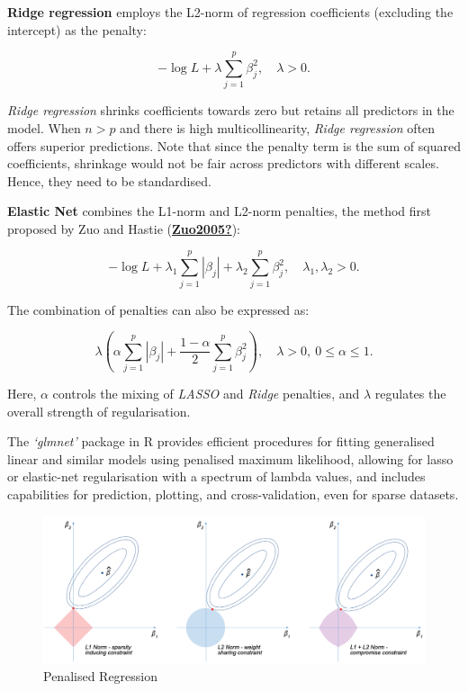 \documentclass[
  11pt,
]{article}
\begin{document}
\textbf{Ridge regression} employs the L2-norm of regression coefficients
(excluding the intercept) as the penalty:

\begin{equation}
- \log L + \lambda \sum_{j=1}^{p} \beta_j^2, \quad \lambda > 0.
\end{equation}

\emph{Ridge regression} shrinks coefficients towards zero but retains
all predictors in the model. When \(n > p\) and there is high
multicollinearity, \emph{Ridge regression} often offers superior
predictions. Note that since the penalty term is the sum of squared
coefficients, shrinkage would not be fair across predictors with
different scales. Hence, they need to be standardised.

\textbf{Elastic Net} combines the L1-norm and L2-norm penalties, the
method first proposed by Zuo and Hastie
(\protect\hyperlink{ref-Zuo2005}{\textbf{Zuo2005?}}):

\begin{equation}
- \log L + \lambda_1 \sum_{j=1}^{p} |\beta_j| + \lambda_2 \sum_{j=1}^{p} \beta_j^2, \quad \lambda_1, \lambda_2 > 0.
\end{equation}

The combination of penalties can also be expressed as:

\begin{equation}
\lambda \left( \alpha \sum_{j=1}^{p} |\beta_j| + \frac{1-\alpha}{2} \sum_{j=1}^{p} \beta_j^2 \right), \quad \lambda > 0, \ 0 \leq \alpha \leq 1.
\end{equation}

Here, \(\alpha\) controls the mixing of \emph{LASSO} and \emph{Ridge}
penalties, and \(\lambda\) regulates the overall strength of
regularisation.

The \emph{`glmnet'} package in R provides efficient procedures for
fitting generalised linear and similar models using penalised maximum
likelihood, allowing for lasso or elastic-net regularisation with a
spectrum of lambda values, and includes capabilities for prediction,
plotting, and cross-validation, even for sparse datasets.

\begin{figure}

{\centering \includegraphics[width=1\linewidth]{reg_pen} 

}

\caption{Penalised Regression}\label{fig:penalisation graphics}
\end{figure}
\end{document}
